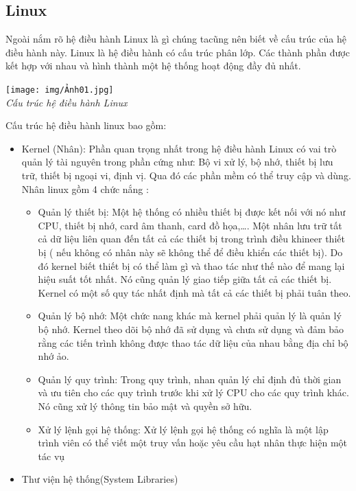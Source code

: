\documentclass[12pt,a4paper]{article}
\begin{document}
\subsection{Linux}
 Ngoài nắm rõ hệ điều hành Linux là gì chúng tacũng nên biết về cấu trúc của hệ điều hành này. Linux là hệ điều hành có cấu trúc phân lớp. Các thành phần được kết hợp với nhau và hình thành một hệ thống hoạt động đầy đủ nhất.
\begin{center}
	\texttt{[image: img/Ảnh01.jpg]}\\
	\textit{Cấu trúc hệ điều hành Linux}
\end{center}

Cấu trúc hệ điều hành linux bao gồm: 

 
\begin{itemize}
	\item Kernel (Nhân):  Phần quan trọng nhất trong hệ điều hành Linux có vai trò quản lý tài nguyên trong phần cứng như: Bộ vi xử lý, bộ nhớ, thiết bị lưu trữ, thiết bị ngoại vi, định vị. Qua đó các phần mềm có thể truy cập và dùng. Nhân linux gồm 4 chức nắng :
	\begin{itemize}
		\item Quản lý thiết bị: Một hệ thống có nhiều thiết bị được kết nối với nó như CPU, thiết bị nhớ, card âm thanh, card đồ họa,…. Một nhân lưu trữ tất cả dữ liệu liên quan đến tất cả các thiết bị trong trình điều khineer thiết bị ( nếu không có nhân này sẽ không thể để điều khiển các thiết bị). Do đó kernel biết thiết bị có thể làm gì và thao tác như thế nào để mang lại hiệu suất tốt nhất. Nó cũng quản lý giao tiếp giữa tất cả các thiết bị. Kernel có một số quy tác nhất định mà tất cả các thiết bị phải tuân theo.
		\item Quản lý bộ nhớ: Một chức nang khác mà kernel phải quản lý là quản lý bộ nhớ. Kernel theo dõi bộ nhớ đã sử dụng và chưa sử dụng và đảm bảo rằng các tiến trình không được thao tác dữ liệu của nhau bằng địa chỉ bộ nhớ ảo.
		\item Quản lý quy trình: Trong quy trình, nhan quản lý chỉ định đủ thời gian và ưu tiên cho các quy trình trước khi xử lý CPU cho các quy trình khác. Nó cũng xử lý thông tin bảo mật và quyền sở hữu.
		\item Xử lý lệnh gọi hệ thống: Xử lý lệnh gọi hệ thống có nghĩa là một lập trình viên có thể viết một truy vấn hoặc yêu cầu hạt nhân thực hiện một tác vụ
	\end{itemize}
	\item Thư viện hệ thống(System Libraries)
	\begin{itemize}

\end{itemize}
\end{itemize}
\end{document}
